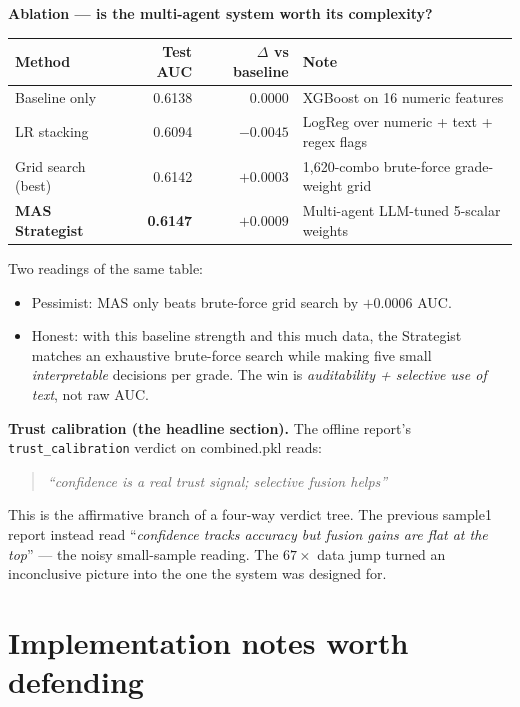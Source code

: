 \documentclass[11pt,letterpaper]{article}
\begin{document}
\textbf{Ablation --- is the multi-agent system worth its complexity?}

\begin{center}\small
\begin{tabular}{@{}lrrl@{}}
\toprule
\textbf{Method} & \textbf{Test AUC} & \textbf{$\Delta$ vs baseline} & \textbf{Note} \\
\midrule
Baseline only           & 0.6138 & $0.0000$ & XGBoost on 16 numeric features \\
LR stacking             & 0.6094 & $-0.0045$ & LogReg over numeric + text + regex flags \\
Grid search (best)      & 0.6142 & $+0.0003$ & 1{,}620-combo brute-force grade-weight grid \\
\textbf{MAS Strategist} & \textbf{0.6147} & $\boldsymbol{+0.0009}$ & Multi-agent LLM-tuned 5-scalar weights \\
\bottomrule
\end{tabular}
\end{center}

Two readings of the same table:
\begin{itemize}
  \item Pessimist: MAS only beats brute-force grid search by $+0.0006$ AUC.
  \item Honest: with this baseline strength and this much data, the
        Strategist matches an exhaustive brute-force search while making
        five small \emph{interpretable} decisions per grade. The win is
        \emph{auditability + selective use of text}, not raw AUC.
\end{itemize}

\textbf{Trust calibration (the headline section).} The offline report's
\texttt{trust\_calibration} verdict on combined.pkl reads:
\begin{quote}\itshape
``confidence is a real trust signal; selective fusion helps''
\end{quote}
This is the affirmative branch of a four-way verdict tree. The previous
sample1 report instead read ``\textit{confidence tracks accuracy but fusion
gains are flat at the top}'' --- the noisy small-sample reading. The
$67\times$ data jump turned an inconclusive picture into the one the
system was designed for.

\section{Implementation notes worth defending}
\end{document}
